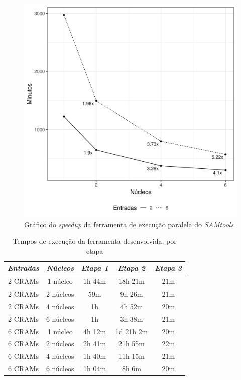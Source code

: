 \documentclass[cic,tc]{iiufrgs}
\begin{document}
\begin{figure}
  \caption{Gráfico do \textit{speedup} da ferramenta de execução paralela do \textit{SAMtools}}
    \begin{center}
      \includegraphics[width=0.55\linewidth]{img/speedup.png}
    \end{center}
    \label{fig:speedup}
\end{figure}

\begin{table}[h]
    \caption{Tempos de execução da ferramenta desenvolvida, por etapa}
    \centering
        \begin{tabular}{c|c|c|c|c}
          \hline
          \textit{Entradas}  & \textit{Núcleos} & \textit{Etapa 1}  & \textit{Etapa 2} & \textit{Etapa 3} \\
          \hline
          \hline
          2 CRAMs & 1 núcleo  & 1h 44m &    18h 21m & 21m \\
          2 CRAMs & 2 núcleos &    59m &     9h 26m & 21m \\
          2 CRAMs & 4 núcleos & 1h     &     4h 52m & 20m \\
          2 CRAMs & 6 núcleos & 1h     &     3h 38m & 21m \\
          6 CRAMs & 1 núcleo  & 4h 12m & 1d 21h  2m & 20m \\
          6 CRAMs & 2 núcleos & 2h 41m &    21h 55m & 22m \\
          6 CRAMs & 4 núcleos & 1h 40m &    11h 15m & 21m \\
          6 CRAMs & 6 núcleos & 1h 04m &     8h  6m & 20m \\
          \hline
        \end{tabular}
    \label{tbl:stages}
\end{table}
\end{document}
